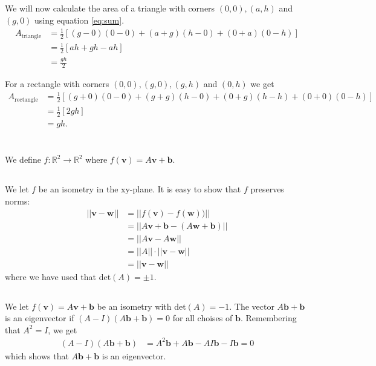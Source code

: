 \documentclass[a4paper,10pt,english]{article}
\begin{document}
\subsection{} \label{1d}
We will now calculate the area of a triangle with corners $(0, 0), (a, h)$ and $(g, 0)$ using equation \ref{eq:sum}.
\begin{align*}
    A_{\text{triangle}} &= \frac{1}{2} [(g-0)(0-0) + (a+g)(h-0) + (0+a)(0-h)] \\
    &= \frac{1}{2} [ah + gh - ah] \\
    &= \frac{gh}{2}
\end{align*}

For a rectangle with corners $(0, 0), (g, 0), (g, h)$ and $(0, h)$ we get
\begin{align*}
    A_{\text{rectangle}} &= \frac{1}{2} [(g+0)(0-0) + (g+g)(h-0) + (0+g)(h-h) + (0+0)(0-h)] \\
    &= \frac{1}{2} [2gh] \\
    &= gh.
\end{align*}

\section{} \label{2}

\newpage

\section{} \label{3}
We define $f: \mathbb{R}^2 \to \mathbb{R}^2$ where $f(\bm{v}) = A \bm{v} + \bm{b}$.

\subsection{} \label{3a}
We let $f$ be an isometry in the xy-plane. It is easy to show that $f$ preserves norms:
\begin{align*}
    ||\bm{v} - \bm{w}|| &= ||f(\bm{v}) - f(\bm{w}))|| \\
    &= ||A\bm{v} + \bm{b} - (A\bm{w} + \bm{b})|| \\
    &= ||A\bm{v} - A\bm{w}|| \\
    &= ||A|| \cdot ||\bm{v} - \bm{w}|| \\
    &= ||\bm{v} - \bm{w}||
\end{align*}
where we have used that det$(A)=\pm 1$.

\subsection{} \label{3b}
We let $f(\bm{v}) = A \bm{v} + \bm{b}$ be an isometry with det$(A)=-1$. The vector $A \bm{b} + \bm{b}$ is an eigenvector if $(A-I)(A \bm{b} + \bm{b}) = 0$ for all choises of $\bm{b}$. Remembering that $A^2 = I$, we get
\begin{align*}
    (A-I)(A \bm{b} + \bm{b}) &= A^2 \bm{b} + A \bm{b} - AI \bm{b} - I \bm{b} = 0
\end{align*}
which shows that $A \bm{b} + \bm{b}$ is an eigenvector.
\end{document}
